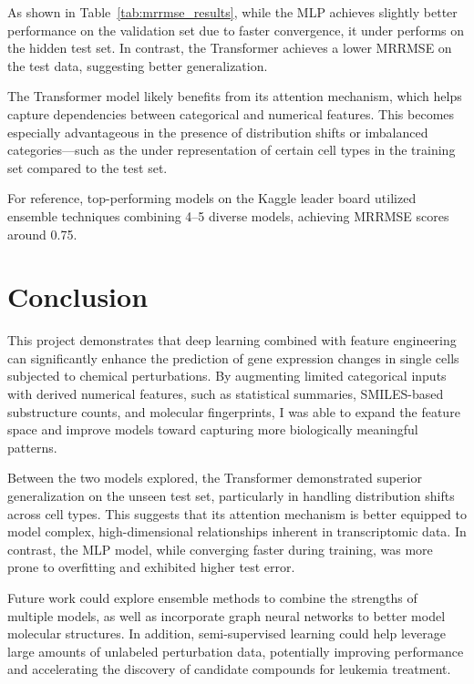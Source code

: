 \documentclass[11pt, oneside]{article}   	%
\begin{document}
As shown in Table~\ref{tab:mrrmse_results}, while the MLP achieves slightly better performance on the validation set due to faster convergence, it under performs on the hidden test set. In contrast, the Transformer achieves a lower MRRMSE on the test data, suggesting better generalization.

The Transformer model likely benefits from its attention mechanism, which helps capture dependencies between categorical and numerical features. This becomes especially advantageous in the presence of distribution shifts or imbalanced categories—such as the under representation of certain cell types in the training set compared to the test set.

For reference, top-performing models on the Kaggle leader board utilized ensemble techniques combining 4–5 diverse models, achieving MRRMSE scores around 0.75.



\section*{Conclusion}

This project demonstrates that deep learning combined with feature engineering can significantly enhance the prediction of gene expression changes in single cells subjected to chemical perturbations. By augmenting limited categorical inputs with derived numerical features, such as statistical summaries, SMILES-based substructure counts, and molecular fingerprints, I was able to expand the feature space and improve models toward capturing more biologically meaningful patterns.

Between the two models explored, the Transformer demonstrated superior generalization on the unseen test set, particularly in handling distribution shifts across cell types. This suggests that its attention mechanism is better equipped to model complex, high-dimensional relationships inherent in transcriptomic data. In contrast, the MLP model, while converging faster during training, was more prone to overfitting and exhibited higher test error.

Future work could explore ensemble methods to combine the strengths of multiple models, as well as incorporate graph neural networks to better model molecular structures. In addition, semi-supervised learning could help leverage large amounts of unlabeled perturbation data, potentially improving performance and accelerating the discovery of candidate compounds for leukemia treatment.
\end{document}
